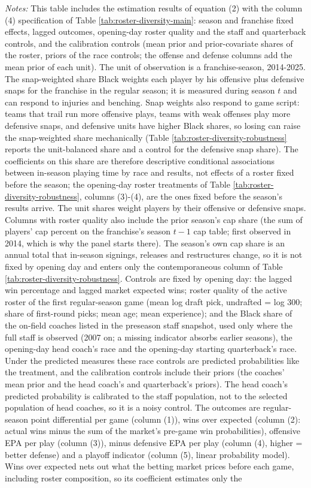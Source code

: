 {\footnotesize
\noindent\textit{Notes:} This table includes the estimation results of equation (2) with the column (4) specification of Table \ref{tab:roster-diversity-main}: season and franchise fixed effects, lagged outcomes, opening-day roster quality and the staff and quarterback controls, and the calibration controls (mean prior and prior-covariate shares of the roster, priors of the race controls; the offense and defense columns add the mean prior of each unit). The unit of observation is a franchise-season, 2014-2025. The snap-weighted share Black weights each player by his offensive plus defensive snaps for the franchise in the regular season; it is measured during season $t$ and can respond to injuries and benching. Snap weights also respond to game script: teams that trail run more offensive plays, teams with weak offenses play more defensive snaps, and defensive units have higher Black shares, so losing can raise the snap-weighted share mechanically (Table \ref{tab:roster-diversity-robustness} reports the unit-balanced share and a control for the defensive snap share). The coefficients on this share are therefore descriptive conditional associations between in-season playing time by race and results, not effects of a roster fixed before the season; the opening-day roster treatments of Table \ref{tab:roster-diversity-robustness}, columns (3)-(4), are the ones fixed before the season's results arrive. The unit shares weight players by their offensive or defensive snaps. Columns with roster quality also include the prior season's cap share (the sum of players' cap percent on the franchise's season $t-1$ cap table; first observed in 2014, which is why the panel starts there). The season's own cap share is an annual total that in-season signings, releases and restructures change, so it is not fixed by opening day and enters only the contemporaneous column of Table \ref{tab:roster-diversity-robustness}. Controls are fixed by opening day: the lagged win percentage and lagged market expected wins; roster quality of the active roster of the first regular-season game (mean log draft pick, undrafted = log 300; share of first-round picks; mean age; mean experience); and the Black share of the on-field coaches listed in the preseason staff snapshot, used only where the full staff is observed (2007 on; a missing indicator absorbs earlier seasons), the opening-day head coach's race and the opening-day starting quarterback's race. Under the predicted measures these race controls are predicted probabilities like the treatment, and the calibration controls include their priors (the coaches' mean prior and the head coach's and quarterback's priors). The head coach's predicted probability is calibrated to the staff population, not to the selected population of head coaches, so it is a noisy control. The outcomes are regular-season point differential per game (column (1)), wins over expected (column (2): actual wins minus the sum of the market's pre-game win probabilities), offensive EPA per play (column (3)), minus defensive EPA per play (column (4), higher = better defense) and a playoff indicator (column (5), linear probability model). Wins over expected nets out what the betting market prices before each game, including roster composition, so its coefficient estimates only the }
